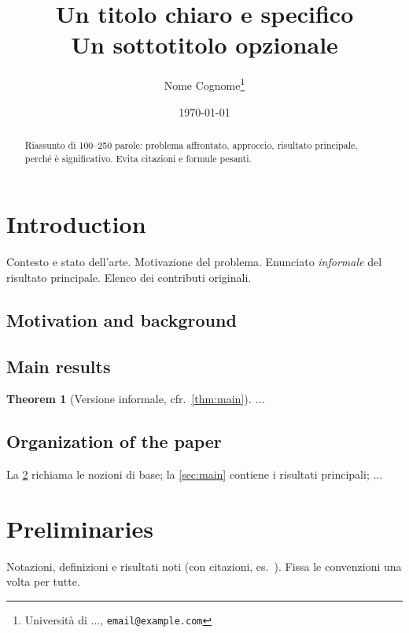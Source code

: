 \documentclass[11pt,a4paper]{article}
\title{Un titolo chiaro e specifico\\[2pt]
       \large Un sottotitolo opzionale}
\author{Nome Cognome\thanks{Università di ..., \texttt{email@example.com}}}
\date{\today}
\theoremstyle{plain}
\newtheorem{theorem}{Theorem}[section]
\theoremstyle{definition}
\begin{document}
\maketitle

\begin{abstract}
Riassunto di 100--250 parole: problema affrontato, approccio, risultato
principale, perché è significativo. Evita citazioni e formule pesanti.
\end{abstract}

\tableofcontents   %

\section{Introduction}
\label{sec:intro}

Contesto e stato dell'arte. Motivazione del problema. Enunciato
\emph{informale} del risultato principale. Elenco dei contributi originali.

\subsection{Motivation and background}
\label{sec:motivation}

\subsection{Main results}
\label{sec:main-results-intro}

\begin{theorem}[Versione informale, cfr.\ \cref{thm:main}]
...
\end{theorem}

\subsection{Organization of the paper}
La \cref{sec:prelim} richiama le nozioni di base; la \cref{sec:main}
contiene i risultati principali; ...

\section{Preliminaries}
\label{sec:prelim}

Notazioni, definizioni e risultati noti (con citazioni, es.\
\cite{esempio2024}). Fissa le convenzioni una volta per tutte.
\end{document}
